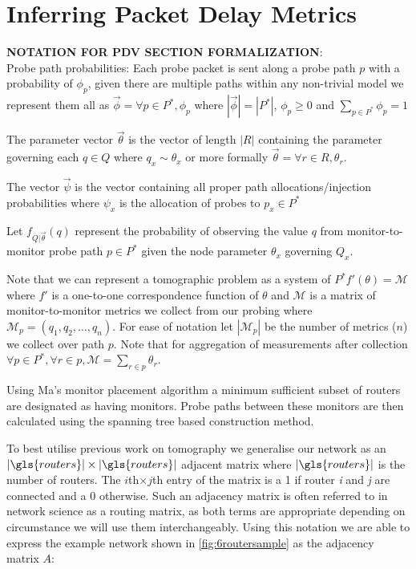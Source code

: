 \section{Inferring Packet Delay Metrics}
\label{sec:Mnetworkprobing}
\begin{mdframed}
\textbf{NOTATION FOR PDV SECTION FORMALIZATION}:\\
Probe path probabilities: Each probe packet is sent along a probe path $p$ with a probability of $\phi_p$, given there are multiple paths within any non-trivial model we represent them all as $\vec{\phi}=\forall p\in P^*, \phi_p$ where $|\vec{\phi}|=|P^*|$, $\phi_p \geq 0$ and $\sum_{p\in P^*}\phi_p = 1$

The parameter vector $\vec{\theta}$ is the vector of length $|R|$ containing the parameter governing each $q\in Q$ where $ q_x \sim \theta_x$ or more formally $\vec{\theta}=\forall r\in R, \theta_r$.

The vector $\vec{\psi}$ is the vector containing all proper path allocations/injection probabilities where $\psi_x$ is the allocation of probes to $p_x\in P^*$ 

Let $f_{Q|\vec{\theta}}(q)$ represent the probability of observing the value $q$ from monitor-to-monitor probe path $p\in P^*$ given the node parameter $\theta_x$ governing $Q_x$.

Note that we can represent a tomographic problem as a system of $P^*f'(\theta)=\mathcal{M}$ where $f'$ is a one-to-one correspondence function of $\theta$ and $\mathcal{M}$ is a matrix of monitor-to-monitor metrics we collect from our probing where $\mathcal{M}_p = (q_1,q_2,\ldots, q_n)$. For ease of notation let $|\mathcal{M}_p|$ be the number of metrics ($n$) we collect over path $p$. Note that for aggregation of measurements after collection $\forall p\in P^*, \forall r\in p, \mathcal{M}=\sum_{r\in p}\theta_r$.
\end{mdframed}

  Using Ma's monitor placement algorithm a minimum sufficient subset of routers are designated as having monitors. Probe paths between these monitors are then calculated using the spanning tree based construction method.

To best utilise previous work on tomography we generalise our network as an $|\gls{routers}|\times|\gls{routers}|$ adjacent matrix where $|\gls{routers}|$ is the number of routers. The $i$th$\times j$th entry of the matrix is a 1 if router \emph{i} and \emph{j} are connected and a 0 otherwise. Such an adjacency matrix is often referred to in network science as a routing matrix, as both terms are appropriate depending on circumstance we will use them interchangeably. Using this notation we are able to express the example network shown in \cref{fig:6routersample} as the adjacency matrix $A$:

